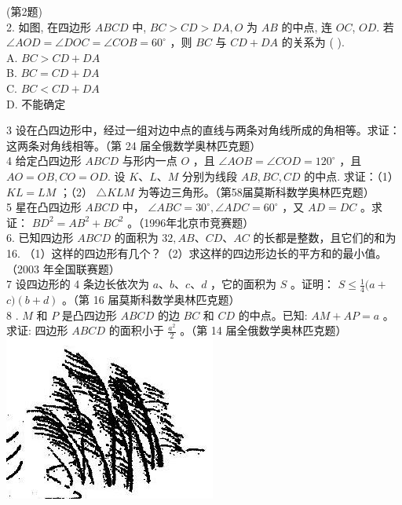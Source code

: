 \documentclass[10pt]{article}
\begin{document}
(第2题)\\
2. 如图, 在四边形 $A B C D$ 中, $B C>C D>D A, O$ 为 $A B$ 的中点, 连 $O C$, $O D$. 若 $\angle A O D=\angle D O C=\angle C O B=60^{\circ}$ ，则 $B C$ 与 $C D+D A$ 的关系为 ( ).\\
A. $B C>C D+D A$\\
B. $B C=C D+D A$\\
C. $B C<C D+D A$\\
D. 不能确定

3 设在凸四边形中，经过一组对边中点的直线与两条对角线所成的角相等。求证：这两条对角线相等。（第 24 届全俄数学奥林匹克题）\\
4 给定凸四边形 $A B C D$ 与形内一点 $O$ ，且 $\angle A O B=\angle C O D=120^{\circ}$ ，且 $A O=O B, C O=O D$. 设 $K 、 L 、 M$ 分别为线段 $A B, B C, C D$ 的中点. 求证：（1） $K L=L M$ ；（2） $\triangle K L M$ 为等边三角形。（第58届莫斯科数学奥林匹克题）\\
5 星在凸四边形 $A B C D$ 中， $\angle A B C=30^{\circ}, \angle A D C=60^{\circ}$ ，又 $A D=D C$ 。求证： $B D^{2}=A B^{2}+B C^{2}$ 。（1996年北京市竞赛题）\\
6. 已知四边形 $A B C D$ 的面积为 $32, A B 、 C D 、 A C$ 的长都是整数，且它们的和为 16. （1）这样的四边形有几个？（2）求这样的四边形边长的平方和的最小值。（2003 年全国联赛题）\\
7 设四边形的 4 条边长依次为 $a 、 b 、 c 、 d$ ，它的面积为 $S$ 。证明： $S \leqslant \frac{1}{4}(a+$ $c)(b+d)$ 。（第 16 届莫斯科数学奥林匹克题）\\
8 . $M$ 和 $P$ 是凸四边形 $A B C D$ 的边 $B C$ 和 $C D$ 的中点。已知: $A M+A P=a$ 。求证: 四边形 $A B C D$ 的面积小于 $\frac{a^{2}}{2}$ 。（第 14 届全俄数学奥林匹克题）\\
\includegraphics[max width=\textwidth, center]{2024_10_30_2c8f45efd4a519b08e1ag-109}
\end{document}
